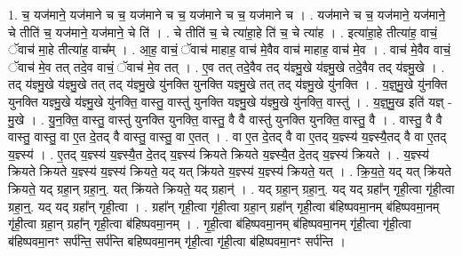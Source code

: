 \documentclass[17pt]{extarticle}
\begin{document}
1. च॒ यज॑माने॒ यज॑माने च च॒ यज॑माने च च॒ यज॑माने च च॒ यज॑माने च । . यज॑माने च च॒ यज॑माने॒ यज॑माने॒ चे तीति॑ च॒ यज॑माने॒ यज॑माने॒ चे ति॑ । . चे तीति॑ च॒ चे त्या॑हा॒हे ति॑ च॒ चे त्या॑ह । . इत्या॑हा॒हे तीत्या॑ह॒ वाचं॒ ॅवाच॑ मा॒हे तीत्या॑ह॒ वाच᳚म् । . आ॒ह॒ वाचं॒ ॅवाच॑ माहाह॒ वाच॑ मे॒वैव वाच॑ माहाह॒ वाच॑ मे॒व । . वाच॑ मे॒वैव वाचं॒ ॅवाच॑ मे॒व तत् तदे॒व वाचं॒ ॅवाच॑ मे॒व तत् । . ए॒व तत् तदे॒वैव तद् य॑ज्ञ्मु॒खे य॑ज्ञ्मु॒खे तदे॒वैव तद् य॑ज्ञ्मु॒खे । . तद् य॑ज्ञ्मु॒खे य॑ज्ञ्मु॒खे तत् तद् य॑ज्ञ्मु॒खे यु॑नक्ति युनक्ति यज्ञ्मु॒खे तत् तद् य॑ज्ञ्मु॒खे यु॑नक्ति । . य॒ज्ञ्॒मु॒खे यु॑नक्ति युनक्ति यज्ञ्मु॒खे य॑ज्ञ्मु॒खे यु॑नक्ति॒ वास्तु॒ वास्तु॑ युनक्ति यज्ञ्मु॒खे य॑ज्ञ्मु॒खे यु॑नक्ति॒ वास्तु॑ । . य॒ज्ञ्॒मु॒ख इति॑ यज्ञ् - मु॒खे । . यु॒न॒क्ति॒ वास्तु॒ वास्तु॑ युनक्ति युनक्ति॒ वास्तु॒ वै वै वास्तु॑ युनक्ति युनक्ति॒ वास्तु॒ वै । . वास्तु॒ वै वै वास्तु॒ वास्तु॒ वा ए॒त दे॒तद् वै वास्तु॒ वास्तु॒ वा ए॒तत् । . वा ए॒त दे॒तद् वै वा ए॒तद् य॒ज्ञ्स्य॑ य॒ज्ञ्स्यै॒तद् वै वा ए॒तद् य॒ज्ञ्स्य॑ । . ए॒तद् य॒ज्ञ्स्य॑ य॒ज्ञ्स्यै॒त दे॒तद् य॒ज्ञ्स्य॑ क्रियते क्रियते य॒ज्ञ्स्यै॒त दे॒तद् य॒ज्ञ्स्य॑ क्रियते । . य॒ज्ञ्स्य॑ क्रियते क्रियते य॒ज्ञ्स्य॑ य॒ज्ञ्स्य॑ क्रियते॒ यद् यत् क्रि॑यते य॒ज्ञ्स्य॑ य॒ज्ञ्स्य॑ क्रियते॒ यत् । . क्रि॒य॒ते॒ यद् यत् क्रि॑यते क्रियते॒ यद् ग्रहा॒न् ग्रहा॒न्॒. यत् क्रि॑यते क्रियते॒ यद् ग्रहान्॑ । . यद् ग्रहा॒न् ग्रहा॒न्॒. यद् यद् ग्रहा᳚न् गृही॒त्वा गृ॑ही॒त्वा ग्रहा॒न्॒. यद् यद् ग्रहा᳚न् गृही॒त्वा । . ग्रहा᳚न् गृही॒त्वा गृ॑ही॒त्वा ग्रहा॒न् ग्रहा᳚न् गृही॒त्वा ब॑हिष्पवमा॒नम् ब॑हिष्पवमा॒नम् गृ॑ही॒त्वा ग्रहा॒न् ग्रहा᳚न् गृही॒त्वा ब॑हिष्पवमा॒नम् । . गृ॒ही॒त्वा ब॑हिष्पवमा॒नम् ब॑हिष्पवमा॒नम् गृ॑ही॒त्वा गृ॑ही॒त्वा ब॑हिष्पवमा॒नꣳ सर्प॑न्ति॒ सर्प॑न्ति बहिष्पवमा॒नम् गृ॑ही॒त्वा गृ॑ही॒त्वा ब॑हिष्पवमा॒नꣳ सर्प॑न्ति । \newline
\end{document}
